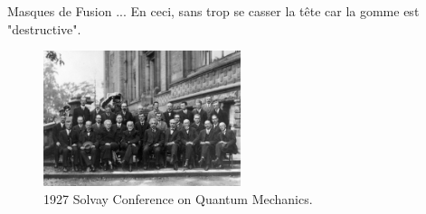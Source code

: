 \documentclass[10pt,svgnames,usenames,table]{beamer}
\begin{document}
	\begin{frame}{Masques de Fusion}
		... En ceci, sans trop se casser la tête car la gomme est "destructive".

		\begin{figure}[H]
			\centering
			\includegraphics[height=150px]{Images/mask/Conference_Solvay}
			\caption{\scriptsize{1927 Solvay Conference on Quantum Mechanics.}}
		\end{figure}

	\end{frame}	
\end{document}
